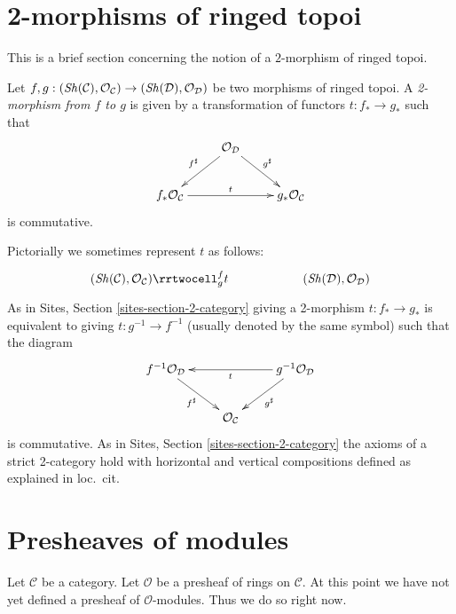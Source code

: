 \section{2-morphisms of ringed topoi}
\label{section-2-category}

\noindent
This is a brief section concerning the notion of a $2$-morphism
of ringed topoi.

\begin{definition}
\label{definition-2-morphism-ringed-topoi}
Let
$f, g :
(\mathop{\mathit{Sh}}\nolimits(\mathcal{C}), \mathcal{O}_\mathcal{C})
\to
(\mathop{\mathit{Sh}}\nolimits(\mathcal{D}), \mathcal{O}_\mathcal{D})$
be two morphisms of ringed topoi. A {\it 2-morphism from $f$ to $g$}
is given by a transformation of functors $t : f_* \to g_*$ such that
$$
\xymatrix{
& \mathcal{O}_\mathcal{D}
\ar[ld]_{f^\sharp}
\ar[rd]^{g^\sharp} \\
f_*\mathcal{O}_\mathcal{C} \ar[rr]^t & &
g_*\mathcal{O}_\mathcal{C}
}
$$
is commutative.
\end{definition}

\noindent
Pictorially we sometimes represent $t$ as follows:
$$
\xymatrix{
(\Sh(\mathcal{C}), \mathcal{O}_\mathcal{C})
\rrtwocell^f_g{t}
&
&
(\Sh(\mathcal{D}), \mathcal{O}_\mathcal{D})
}
$$
As in
Sites, Section \ref{sites-section-2-category}
giving a 2-morphism $t : f_* \to g_*$ is equivalent to giving
$t : g^{-1} \to f^{-1}$ (usually denoted by the same symbol)
such that the diagram
$$
\xymatrix{
f^{-1}\mathcal{O}_\mathcal{D}
\ar[rd]_{f^\sharp}  & &
g^{-1}\mathcal{O}_\mathcal{D} \ar[ll]^t \ar[ld]^{g^\sharp} \\
& \mathcal{O}_\mathcal{C}
}
$$
is commutative. As in
Sites, Section \ref{sites-section-2-category}
the axioms of a strict 2-category hold with horizontal and
vertical compositions defined as explained in loc.\ cit.










\section{Presheaves of modules}
\label{section-presheaves-modules}

\noindent
Let $\mathcal{C}$ be a category.
Let $\mathcal{O}$ be a presheaf of rings on $\mathcal{C}$.
At this point we have not yet defined a presheaf of $\mathcal{O}$-modules.
Thus we do so right now.

